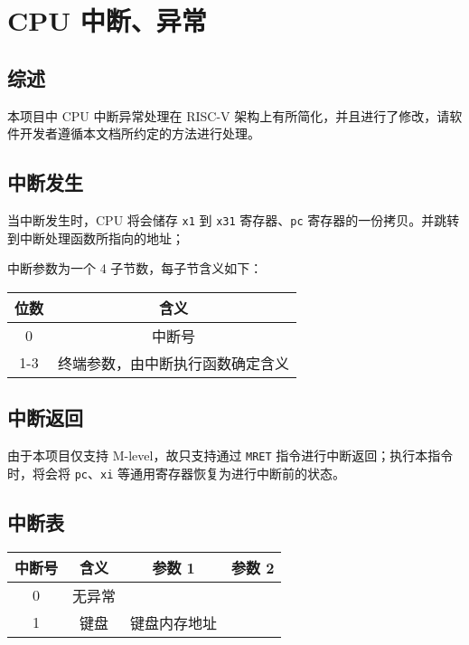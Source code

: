 
\chapter{CPU 中断、异常}

\section{综述}
本项目中 CPU 中断异常处理在 RISC-V 架构上有所简化，并且进行了修改，请软件开发者遵循本文档所约定的方法进行处理。

\section{中断发生}

当中断发生时，CPU 将会储存 \texttt{x1} 到 \texttt{x31} 寄存器、\texttt{pc} 寄存器的一份拷贝。并跳转到中断处理函数所指向的地址；

中断参数为一个 4 子节数，每子节含义如下：
\begin{tabular}{|c|c|}
    \hline
    位数 & 含义 \\\hline
    0     & 中断号 \\\hline
    1-3     & 终端参数，由中断执行函数确定含义 \\\hline
\end{tabular}

\section{中断返回}

由于本项目仅支持 M-level，故只支持通过 \texttt{MRET} 指令进行中断返回；执行本指令时，将会将 \texttt{pc}、\texttt{xi} 等通用寄存器恢复为进行中断前的状态。

\section{中断表}
\begin{tabular}{|c|c|c|c|}
    \hline
    中断号 & 含义 & 参数 1 & 参数 2\\\hline
    0     & 无异常 & &\\\hline
    1     & 键盘 & 键盘内存地址 &\\\hline
\end{tabular}